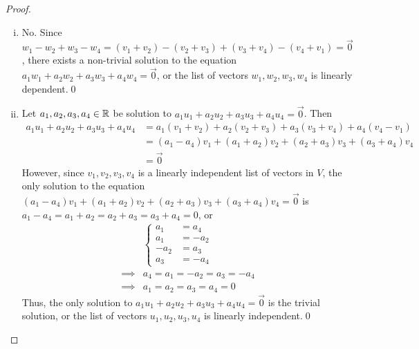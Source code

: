 \begin{proof}
    \renewcommand{\qedsymbol}{$\blacksquare$}
    \begin{enumerate}[(i)]
        \item No. Since $w_1-w_2+w_3-w_4=(v_1+v_2)-(v_2+v_3)+(v_3+v_4)-(v_4+v_1)=\vec{0}$, there exists a non-trivial solution to the equation $a_1w_1+a_2w_2+a_3w_3+a_4w_4=\vec{0}$, or the list of vectors $w_1,w_2,w_3,w_4$ is linearly dependent.\qed
        \item Let $a_1,a_2,a_3,a_4\in\mathbb R$ be solution to $a_1u_1+a_2u_2+a_3u_3+a_4u_4=\vec{0}$. Then 
        \[
            \begin{aligned}
                a_1u_1+a_2u_2+a_3u_3+a_4u_4
                &= a_1(v_1+v_2)+a_2(v_2+v_3)+a_3(v_3+v_4)+a_4(v_4-v_1)\\
                &= (a_1-a_4)v_1+(a_1+a_2)v_2+(a_2+a_3)v_3+(a_3+a_4)v_4\\
                &= \vec{0}
            \end{aligned}
        \]
        However, since $v_1,v_2,v_3,v_4$ is a linearly independent list of vectors in $V$, the only solution to the equation $(a_1-a_4)v_1+(a_1+a_2)v_2+(a_2+a_3)v_3+(a_3+a_4)v_4=\vec{0}$ is $a_1-a_4=a_1+a_2=a_2+a_3=a_3+a_4=0$, or
        \begin{align*}
            &\begin{cases}
                a_1 &=a_4\\
                a_1 &=-a_2\\
                -a_2&=a_3\\
                a_3 &=-a_4
            \end{cases}\\\implies
            &a_4=a_1=-a_2=a_3=-a_4\\\implies
            &a_1=a_2=a_3=a_4=0
        \end{align*}
        Thus, the only solution to $a_1u_1+a_2u_2+a_3u_3+a_4u_4=\vec{0}$ is the trivial solution, or the list of vectors $u_1,u_2,u_3,u_4$ is linearly independent.\qed
    \end{enumerate}
    
    \renewcommand{\qedsymbol}{}
\end{proof}